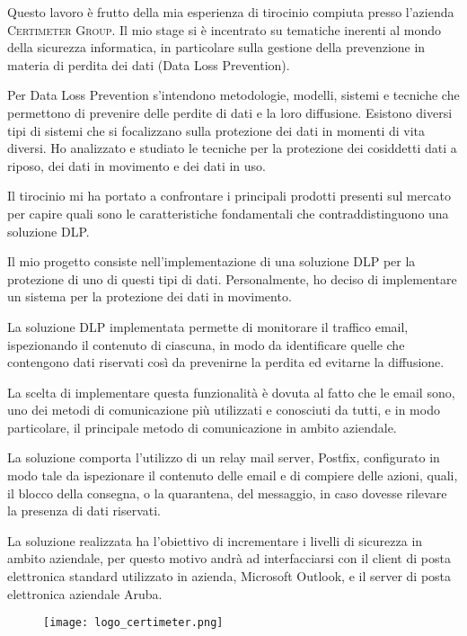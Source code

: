 
Questo lavoro è frutto della mia esperienza di tirocinio compiuta presso l’azienda \textsc{Certimeter Group}. Il mio stage si è incentrato su tematiche inerenti al mondo della sicurezza informatica, in particolare sulla gestione della prevenzione in materia di perdita dei dati (Data Loss Prevention).

Per Data Loss Prevention s’intendono metodologie, modelli, sistemi e tecniche che permettono di prevenire delle perdite di dati e la loro diffusione. Esistono diversi tipi di sistemi che si focalizzano sulla protezione dei dati in momenti di vita diversi. 
Ho analizzato e studiato le tecniche per la protezione dei cosiddetti dati a riposo, dei dati in movimento e dei dati in uso. 

Il tirocinio mi ha portato a confrontare i principali prodotti presenti sul mercato per capire quali sono le caratteristiche fondamentali che contraddistinguono una soluzione DLP.

Il mio progetto consiste nell’implementazione di una soluzione DLP per la protezione di uno di questi tipi di dati. Personalmente, ho deciso di implementare un sistema per la protezione dei dati in movimento.

La soluzione DLP implementata permette di monitorare il traffico email, ispezionando il contenuto di ciascuna, in modo da identificare quelle che contengono dati riservati così da prevenirne la perdita ed evitarne la diffusione.

La scelta di implementare questa funzionalità è dovuta al fatto che le email sono, uno dei metodi di comunicazione più utilizzati e conosciuti da tutti, e in modo particolare, il principale metodo di comunicazione in ambito aziendale.

La soluzione comporta l’utilizzo di un relay mail server, Postfix, configurato in modo tale da ispezionare il contenuto delle email e di compiere delle azioni, quali, il blocco della consegna, o la quarantena, del messaggio, in caso dovesse rilevare la presenza di dati riservati.

La soluzione realizzata ha l’obiettivo di incrementare i livelli di sicurezza in ambito aziendale, per questo motivo andrà ad interfacciarsi con il client di posta elettronica standard utilizzato in azienda, Microsoft Outlook, e il server di posta elettronica aziendale Aruba.




\begin{figure}[b]
    \centering
    \texttt{[image: logo\_certimeter.png]}
\end{figure}